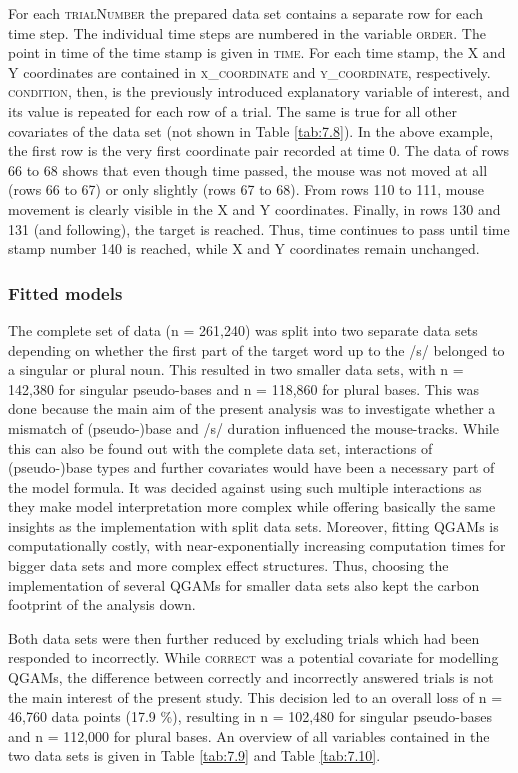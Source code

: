 For each \textsc{trialNumber} the prepared data set contains a separate row for each time step. The individual time steps are numbered in the variable \textsc{order}. The point in time of the time stamp is given in \textsc{time}. For each time stamp, the X and Y coordinates are contained in \textsc{x\_coordinate} and \textsc{y\_coordinate}, respectively. \textsc{condition}, then, is the previously introduced explanatory variable of interest, and its value is repeated for each row of a trial. The same is true for all other covariates of the data set (not shown in Table \ref{tab:7.8}). In the above example, the first row is the very first coordinate pair recorded at time $0$. The data of rows 66 to 68 shows that even though time passed, the mouse was not moved at all (rows 66 to 67) or only slightly (rows 67 to 68). From rows 110 to 111, mouse movement is clearly visible in the X and Y coordinates. Finally, in rows 130 and 131 (and following), the target is reached. Thus, time continues to pass until time stamp number 140 is reached, while X and Y coordinates remain unchanged.

\subsubsection{Fitted models}\label{section07_2_3_1}

The complete set of data (n = 261,240) was split into two separate data sets depending on whether the first part of the target word up to the /s/ belonged to a singular or plural noun. This resulted in two smaller data sets, with n = 142,380 for singular pseudo-bases and n = 118,860 for plural bases. This was done because the main aim of the present analysis was to investigate whether a mismatch of (pseudo-)base and /s/ duration influenced the mouse-tracks. While this can also be found out with the complete data set, interactions of (pseudo-)base types and further covariates would have been a necessary part of the model formula. It was decided against using such multiple interactions as they make model interpretation more complex while offering basically the same insights as the implementation with split data sets. Moreover, fitting QGAMs is computationally costly, with near-exponentially increasing computation times for bigger data sets and more complex effect structures. Thus, choosing the implementation of several QGAMs for smaller data sets also kept the carbon footprint of the analysis down.

Both data sets were then further reduced by excluding trials which had been responded to incorrectly. While \textsc{correct} was a potential covariate for modelling QGAMs, the difference between correctly and incorrectly answered trials is not the main interest of the present study. This decision led to an overall loss of n = 46,760 data points (17.9 \%), resulting in n = 102,480 for singular pseudo-bases and n = 112,000 for plural bases. An overview of all variables contained in the two data sets is given in Table \ref{tab:7.9} and Table \ref{tab:7.10}.

